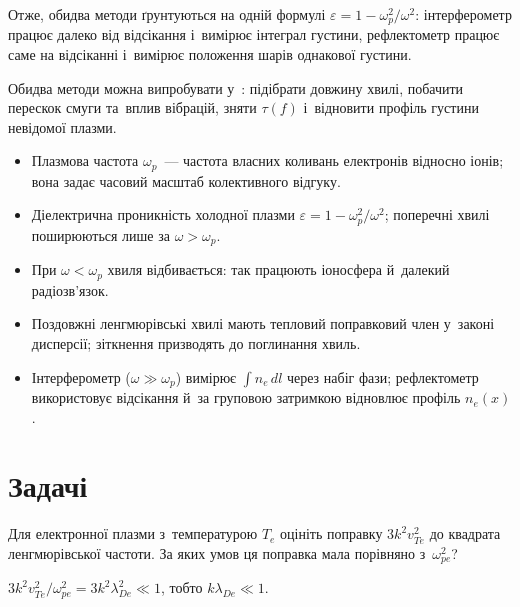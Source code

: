 Отже, обидва методи ґрунтуються на одній формулі $\varepsilon=1-\omega_p^2/\omega^2$: інтерферометр
працює далеко від відсікання і~вимірює інтеграл густини, рефлектометр працює саме на відсіканні
і~вимірює положення шарів однакової густини.

\begin{Simulation}
Обидва методи можна випробувати у~: підібрати довжину хвилі, побачити перескок смуги та~вплив вібрацій, зняти $\tau(f)$ і~відновити профіль густини невідомої плазми.
\end{Simulation}

\begin{Summary}
\begin{itemize}
\item Плазмова частота $\omega_p$~--- частота власних коливань електронів відносно іонів; вона задає часовий масштаб колективного відгуку.
\item Діелектрична проникність холодної плазми $\varepsilon=1-\omega_p^2/\omega^2$; поперечні хвилі поширюються лише за $\omega>\omega_p$.
\item При $\omega<\omega_p$ хвиля відбивається: так працюють іоносфера й~далекий радіозв'язок.
\item Поздовжні ленгмюрівські хвилі мають тепловий поправковий член у~законі дисперсії; зіткнення призводять до поглинання хвиль.
\item Інтерферометр ($\omega\gg\omega_p$) вимірює $\int n_e\,dl$ через набіг фази; рефлектометр використовує
відсікання й~за груповою затримкою відновлює профіль $n_e(x)$.
\end{itemize}
\end{Summary}

\section*{Задачі}

\begin{problem}\label{prb:BohmGross}
Для електронної плазми з~температурою $T_e$ оцініть поправку $3k^2v_{Te}^2$ до квадрата
ленгмюрівської частоти. За яких умов ця поправка мала порівняно з~$\omega_{pe}^2$?
	\begin{solution}
		$3k^2v_{Te}^2/\omega_{pe}^2=3k^2\lambda_{De}^2\ll1$, тобто $k\lambda_{De}\ll1$.
	\end{solution}
\end{problem}

